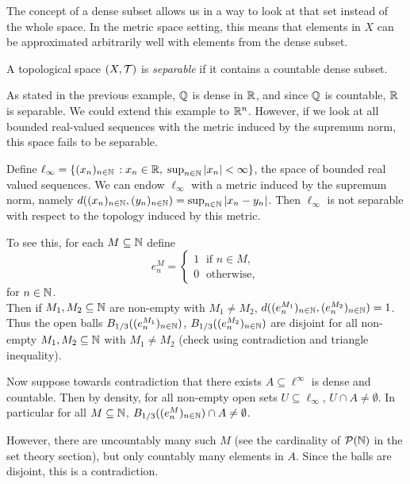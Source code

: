 \documentclass{article}
\begin{document}
The concept of a dense subset allows us in a way to look at that set instead of the whole space. In the metric space setting, this means that elements in $X$ can be approximated arbitrarily well with elements from the dense subset.

\begin{definition}
A topological space $(X,\mathcal{T})$ is \emph{separable} if it contains a countable dense subset.
\end{definition}

As stated in the previous example, ${\mathbb{Q}}$ is dense in ${\mathbb{R}}$, and since ${\mathbb{Q}}$ is countable, ${\mathbb{R}}$ is separable. We could extend this example to ${\mathbb{R}}^n$. However, if we look at all bounded real-valued sequences with the metric induced by the supremum norm, this space fails to be separable. 

\begin{example}
Define $\ell_\infty=\{ (x_n)_{n\in {\mathbb{N}}} \, : x_n \in {\mathbb{R}} , \; \sup_{n\in {\mathbb{N}}} \vert x_n \vert <\infty \}$, the space of bounded real valued sequences. We can endow $\ell_\infty$ with a metric induced by the supremum norm, namely $d((x_n)_{n\in {\mathbb{N}}}, (y_n)_{n\in {\mathbb{N}}}) = \sup_{n\in {\mathbb{N}}} \vert x_n-y_n\vert$. 
Then $\ell_\infty$ is not separable with respect to the topology induced by this metric. 

To see this, for each $M\subseteq {\mathbb{N}}$ define 
\begin{equation*}
    e^M_n = \begin{cases} 1 \; \text{ if } n \in M,\\
    0 \; \text{ otherwise},
    \end{cases}
\end{equation*}
for $n \in {\mathbb{N}}$.  \\
Then if $M_1, M_2\subseteq {\mathbb{N}}$ are non-empty with $M_1\neq M_2$, $d((e^{M_1}_n)_{n\in {\mathbb{N}}},(e^{M_2}_n)_{n\in {\mathbb{N}}}) = 1$. Thus the open balls $B_{1/3}((e^{M_1}_n)_{n \in {\mathbb{N}}})$, $B_{1/3}((e^{M_2}_n)_{n \in {\mathbb{N}}})$ are disjoint for all non-empty $M_1, M_2\subseteq {\mathbb{N}}$ with $M_1\neq M_2$ (check using contradiction and triangle inequality).

Now suppose towards contradiction that there exists $A \subseteq \ell^\infty$ is dense and countable.  Then by density, for all non-empty open sets $U\subseteq \ell_\infty$, $U\cap A \neq \emptyset$.  In particular for all $M \subseteq {\mathbb{N}}$, $B_{1/3}((e^{M}_n)_{n \in {\mathbb{N}}})\cap A \neq \emptyset$. 

However, there are uncountably many such $M$ (see the cardinality of $\mathcal{P}({\mathbb{N}})$ in the set theory section), but only countably many elements in $A$. Since the balls are disjoint, this is a contradiction. 
\end{example}
\end{document}
